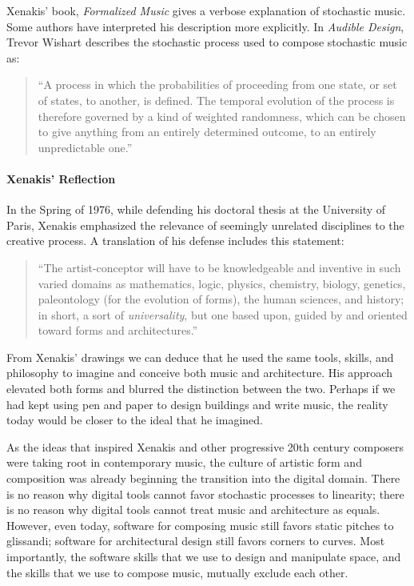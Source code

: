 Xenakis' book, \textit{Formalized Music} gives a verbose explanation
of stochastic music. Some authors have interpreted his description
more explicitly. In \textit{Audible Design}, Trevor Wishart describes
the stochastic process used to compose stochastic music as:
\begin{quotation}
  ``A process in which the probabilities of proceeding from one state,
  or set of states, to another, is defined. The temporal evolution of
  the process is therefore governed by a kind of weighted randomness,
  which can be chosen to give anything from an entirely determined
  outcome, to an entirely unpredictable one.''\cite{Wishart1994}
\end{quotation}

\paragraph{Xenakis' Reflection} In the Spring of 1976, while defending
his doctoral thesis at the University of Paris, Xenakis emphasized the
relevance of seemingly unrelated disciplines to the creative process. A
translation of his defense includes this statement:
\begin{quotation}
  ``The artist-conceptor will have to be knowledgeable and inventive
  in such varied domains as mathematics, logic, physics, chemistry,
  biology, genetics, paleontology (for the evolution of forms), the
  human sciences, and history; in short, a sort of
  \emph{universality}, but one based upon, guided by and oriented
  toward forms and architectures.''\cite{russolo1986art}
\end{quotation}
From Xenakis' drawings we can deduce that he used the same tools,
skills, and philosophy to imagine and conceive both music and
architecture. His approach elevated both forms and blurred the distinction
between the two. Perhaps if we had kept using pen and paper to design
buildings and write music, the reality today would be closer to the
ideal that he imagined. 

As the ideas that inspired Xenakis and other progressive 20th century
composers were taking root in contemporary music, the culture of
artistic form and composition was already beginning the transition
into the digital domain. There is no reason why digital tools cannot
favor stochastic processes to linearity; there is no reason why
digital tools cannot treat music and architecture as equals. However,
even today, software for composing music still favors static pitches
to glissandi; software for architectural design still favors corners
to curves. Most importantly, the software skills that we use to design
and manipulate space, and the skills that we use to compose music,
mutually exclude each other.

